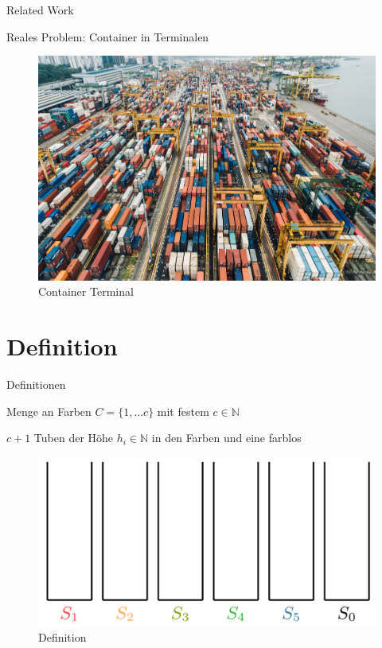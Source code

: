 \documentclass{beamer}
\begin{document}
\begin{frame}{Related Work}
	\begin{pointlist}
		\item Reales Problem: Container in Terminalen
	\end{pointlist}
	\begin{figure}[ht]
		\includegraphics[width=.65\textwidth]{container}
		\caption{Container Terminal}
    \end{figure}
\end{frame}

\section*{Definition}
\begin{frame}{Definitionen}
	\begin{pointlist}
		\item Menge an Farben $C=\{1,\dots c\}$ mit festem $c\in \mathbb{N}$
		\item $c+1$ Tuben der Höhe $h_i\in\mathbb{N}$ in den Farben und eine farblos
		\end{pointlist}
		
\begin{figure}[ht]
		\includegraphics[width=.65\textwidth]{def0}
		\caption{Definition}
    \end{figure}
		\end{frame}
		
\end{document}
